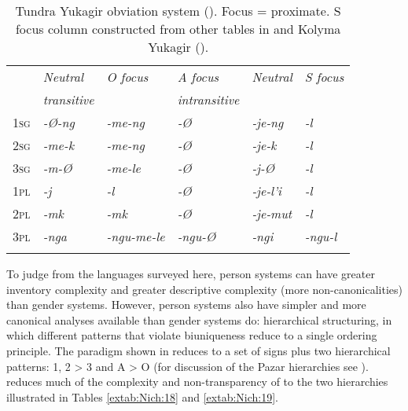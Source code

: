 \documentclass[output=collectionpaper]{langsci/langscibook}
\begin{document}
\begin{table}[t]
\caption{Tundra Yukagir obviation system (\citealt[18]{Maslov2003}).  Focus = proximate. S focus column constructed from other tables in \citet{Maslov2003} and Kolyma Yukagir (\citealt{Maslov2003a}).}
\label{extab:Nich:17}

\begin{tabularx}{\textwidth}{X>{\itshape}X>{\itshape}X>{\itshape}X>{\itshape}X>{\itshape}l}
\lsptoprule
	 &	\normalfont Neutral &	\normalfont O focus	 &\normalfont A focus &	\normalfont Neutral &\normalfont 	S focus  \\
	 &	\normalfont transitive	 &	 &	\normalfont intransitive  &\\
			 \midrule
\noalign{}
	\textsc{1sg} &	-Ø-ng &	-me-ng &	-Ø &	-je-ng &	-l \\
	\textsc{2sg} &	-me-k &	-me-ng &	-Ø &	-je-k &	-l \\
	\textsc{3sg} &	-m-Ø	 &	-me-le &	-Ø &	-j-Ø	 & -l \\
\noalign{}
	\textsc{1pl} &	-j &	-l &	-Ø &	-je-l'i	 & -l \\
	\textsc{2pl} &	-mk &-mk &	-Ø &	-je-mut &	-l \\
	\textsc{3pl} &	-nga &	-ngu-me-le &	-ngu-Ø &	-ngi	 & -ngu-l
\\\lspbottomrule\end{tabularx}
\end{table}

To judge from the languages surveyed here, person systems can have greater inventory complexity and greater descriptive complexity (more non-canonical\-i\-ties) than gender systems. However, person systems also have simpler and more canonical analyses available than gender systems do: hierarchical structuring, in which different patterns that violate biuniqueness reduce to a single ordering principle. The  paradigm shown in  reduces to a set of signs plus two hierarchical patterns: 1, 2 > 3 and A > O (for discussion of the Pazar  hierarchies see \citealt[48]{Oeztuerk2011}). \citet[17, 20]{Maslov2003} reduces much of the complexity and non-transparency of  to the two hierarchies illustrated in Tables \ref{extab:Nich:18} and \ref{extab:Nich:19}.
\end{document}
